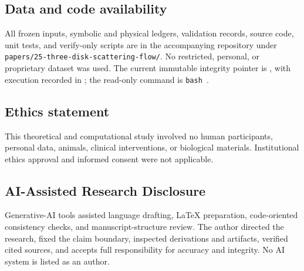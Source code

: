 \documentclass[11pt,a4paper]{article}
\theoremstyle{definition}
\theoremstyle{remark}
\begin{document}
\subsection*{Data and code availability}
All frozen inputs, symbolic and physical ledgers, validation records, source code, unit tests, and verify-only scripts are in the accompanying repository under \texttt{papers/25-three-disk-scattering-flow/}. No restricted, personal, or proprietary dataset was used. The current immutable integrity pointer is , with execution recorded in ; the read-only command is \texttt{bash }.
\subsection*{Ethics statement}
This theoretical and computational study involved no human participants, personal data, animals, clinical interventions, or biological materials. Institutional ethics approval and informed consent were not applicable.
\subsection*{AI-Assisted Research Disclosure}
Generative-AI tools assisted language drafting, LaTeX preparation, code-oriented consistency checks, and manuscript-structure review. The author directed the research, fixed the claim boundary, inspected derivations and artifacts, verified cited sources, and accepts full responsibility for accuracy and integrity. No AI system is listed as an author.



\end{document}
